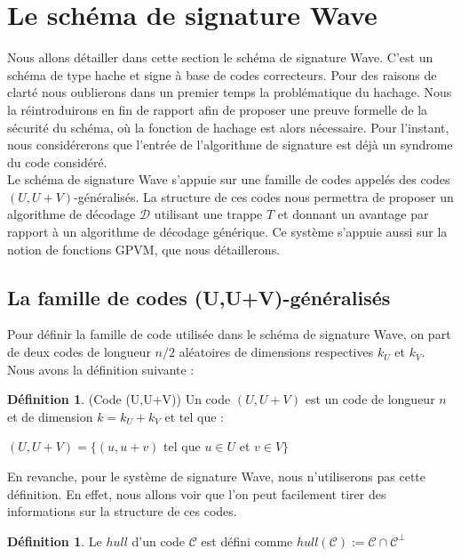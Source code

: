 \documentclass[12pt]{article}
\theoremstyle{plain}
\theoremstyle{definition}
\newtheorem{defi}[thm]{Définition}
\begin{document}
\section{Le schéma de signature Wave}
Nous allons détailler dans cette section le schéma de signature Wave. C'est un schéma de type hache et signe à base de codes correcteurs. Pour des raisons de clarté nous oublierons dans un premier temps la problématique du hachage. Nous la réintroduirons en fin de rapport afin de proposer une preuve formelle de la sécurité du schéma, où la fonction de hachage est alors nécessaire. Pour l'instant, nous considérerons que l'entrée de l'algorithme de signature est déjà un syndrome du code considéré.\\
Le schéma de signature Wave s'appuie sur une famille de codes appelés des codes $(U,U+V)$-généralisés. La structure de ces codes nous permettra de proposer un algorithme de décodage $\mathcal{D}$ utilisant une trappe $T$ et donnant un avantage par rapport à un algorithme de décodage générique. Ce système s'appuie aussi sur la notion de fonctions GPVM, que nous détaillerons. \\

\subsection{La famille de codes (U,U+V)-généralisés}
Pour définir la famille de code utilisée dans le schéma de signature Wave, on part de deux codes de longueur $n/2$ aléatoires de dimensions respectives $k_U$ et $k_V$. Nous avons la définition suivante :

\begin{defi}\label{UV} (Code (U,U+V)) Un code $(U,U+V)$ est un code de longueur $n$ et de dimension $k=k_U+k_V$ et tel que :
\begin{center}
$(U,U+V) = \{(u,u+v)$ tel que $u \in U$ et $v \in V \}$
\end{center}
\end{defi}


\noindent En revanche, pour le système de signature Wave, nous n'utiliserons pas cette définition. En effet, nous allons voir que l'on peut facilement tirer des informations sur la structure de ces codes.\\


\begin{defi} Le  $hull$ d'un code $\mathcal{C}$ est défini comme $hull(\mathcal{C}) := \mathcal{C} \cap \mathcal{C}^{\bot}$
\end{defi}
\end{document}
